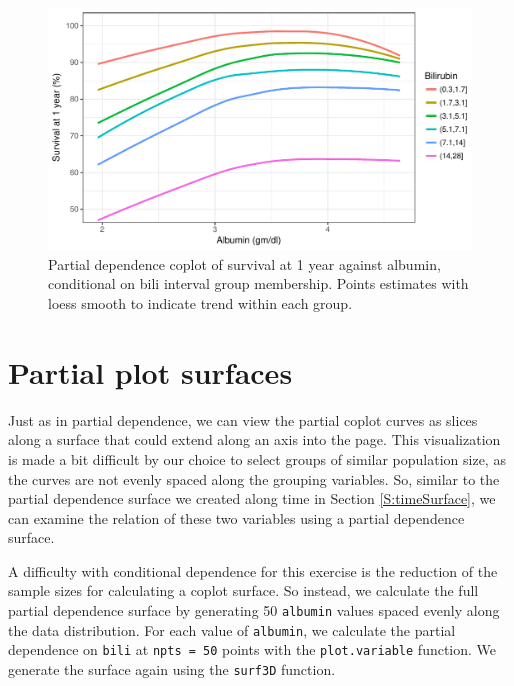 \documentclass[article]{jss}
\begin{document}
\begin{Schunk}
\begin{figure}[!htb]

{\centering \includegraphics{fig-rfs/rfs-albumin-bili-1} 

}

\caption[Partial dependence coplot of survival at 1 year against albumin, conditional on bili interval group membership]{Partial dependence coplot of survival at 1 year against albumin, conditional on bili interval group membership. Points estimates with loess smooth to indicate trend within each group.}\label{fig:albumin-bili}
\end{figure}
\end{Schunk}

\section{Partial plot surfaces}\label{partial-plot-surfaces}

Just as in partial dependence, we can view the partial coplot curves as
slices along a surface that could extend along an axis into the page.
This visualization is made a bit difficult by our choice to select
groups of similar population size, as the curves are not evenly spaced
along the grouping variables. So, similar to the partial dependence
surface we created along time in Section \ref{S:timeSurface}, we can
examine the relation of these two variables using a partial dependence
surface.

A difficulty with conditional dependence for this exercise is the
reduction of the sample sizes for calculating a coplot surface. So
instead, we calculate the full partial dependence surface by generating
50 \texttt{albumin} values spaced evenly along the data distribution.
For each value of \texttt{albumin}, we calculate the partial dependence
on \texttt{bili} at \texttt{npts\ =\ 50} points with the
\texttt{plot.variable} function. We generate the surface again using the
\texttt{surf3D} function.
\end{document}
